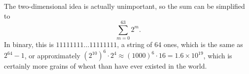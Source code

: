 The two-dimensional idea is actually unimportant, so the
sum can be simplified to
\begin{equation*}
  \sum_{m=0}^{63} 2^m.
\end{equation*}
In binary, this is $11111111\ldots11111111$, a string of
64 ones, which is the same as $2^{64}-1$, or approximately
$(2^{10})^6\cdot 2^4\approx (1000)^6\cdot 16=1.6\times10^{19}$,
which is certainly more grains of wheat than have ever existed
in the world.
